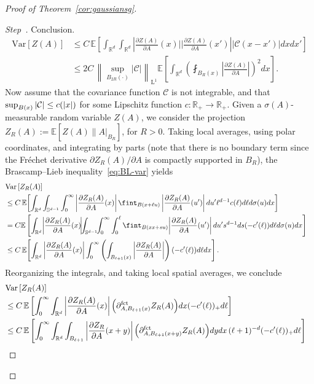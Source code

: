 \documentclass[10pt]{amsart}
\theoremstyle{definition}\newtheorem{defi}[theo]{Definition}\newtheorem{rema}[theo]{Remark}\newtheorem{exam}[theo]{Example}\newtheorem{exem}[theo]{Example}\newtheorem{nota}[theo]{Notation}
\newcommand{\R}{\mathbb R}
\newcommand{\Sp}{\mathbb S}
\newcommand{\E}{\mathbb{E}}
\newcommand{\Cc}{\mathcal C}
\DeclareMathOperator{\Ld}{L}
\newcommand{\parfct}[1]{\partial_{#1}^{\operatorname{fct}}}
\newcommand{\var}[1]{\mathrm{Var}\left[#1\right]}
\newcounter{stepcount}
\newenvironment{step}{\refstepcounter{stepcount}\begin{proof}[Step~\thestepcount]}{\let\qed\relax\end{proof}}
\begin{document}
\begin{proof}[Proof of Theorem~\ref{cor:gaussiansg}]
\begin{step}{Conclusion.}
\begin{align*}
\var{Z(A)}&\le C\,\E\left[\int_{\R^d}\int_{\R^d} \left|\frac{\partial Z(A)}{\partial A}(x)\bigg|\bigg|\frac{\partial Z(A)}{\partial A}(x')\right||\Cc(x-x')|dxdx'\right]
\\
&\le2C\,\left\|\sup_{B_{2R}(\cdot)}|\Cc|\right\|_{\Ld^1}\E\left[\int_{\R^d} \left(\fint_{B_R(x)}\left|\frac{\partial Z(A)}{\partial A}\right|\right)^2dx\right].
\end{align*}
Now assume that the covariance function $\Cc$ is not integrable, and that $\sup_{B(x)}\linebreak|\Cc|\le c(|x|)$ for some Lipschitz function $c:\R_+\to\R_+$. Given a $\sigma(A)$-measurable random variable $Z(A)$, we consider the projection $Z_R(A):=\E[Z(A)\| A|_{B_R}]$, for $R>0$. Taking local averages, using polar coordinates, and integrating by parts (note that there is no boundary term since the Fréchet derivative $\partial Z_R(A)/\partial A$ is compactly supported in $B_R$), the Brascamp--Lieb inequality~\eqref{eq:BL-var} yields
{\small
\begin{align*}
\lefteqn{\var{Z_R(A)}}
\\
&\le C\,\E\!\left[\int_{\R^d}\int_{\Sp^{d-1}}\int_0^\infty
\left|\frac{\partial Z_R(A)}{\partial A}(x) \right|\fint_{B(x+\ell u)}\left|\frac{\partial Z_R(A)}{\partial A}(u')\right|du' \ell^{d-1}c(\ell)d\ell d\sigma(u)dx\right]\\
&=C\E\left[\int_{\R^d}\!\left|\frac{\partial Z_R(A)}{\partial A}(x)\!\right|\!\!\int_{\Sp^{d-1}}\!\!\int_0^\infty\int_0^\ell
\fint_{B(xx+s u)}\!\left|\frac{\partial Z_R(A)}{\partial A}(u')\right|du' s^{d-1}ds(-c'(\ell))d\ell d\sigma(u)dx\right]\\
&\le C\,\E\!\left[\int_{\R^d} \left|\frac{\partial Z_R(A)}{\partial A}(x) \right|\int_0^\infty\left(\int_{B_{\ell+1}(x)}\left|\frac{\partial Z_R(A)}{\partial A}\right|\right)(-c'(\ell))d\ell dx\right].
\end{align*}
}
Reorganizing the integrals, and taking local spatial averages, we conclude
\begin{align*}
\lefteqn{\var{Z_R(A)}}
\\
&\le C\,\E\left[\int_0^\infty \int_{\R^d} \left|\frac{\partial Z_R(A)}{\partial A}(x) \right|\Big(\parfct{A,B_{\ell+1}(x)}Z_R(A)\Big) dx(-c'(\ell))_+d\ell\right]\\
&\le C\,\E\left[\int_0^\infty \int_{\R^d}\int_{B_{\ell+1}}\left|\frac{\partial Z_R}{\partial A}(x+y)\right|\Big(\parfct{A,B_{\ell+1}(x+y)}Z_R(A)\Big)dydx\,(\ell+1)^{-d}(-c'(\ell))_+d\ell\right]\\

\end{align*}
\end{step}
\end{proof}
\end{document}
